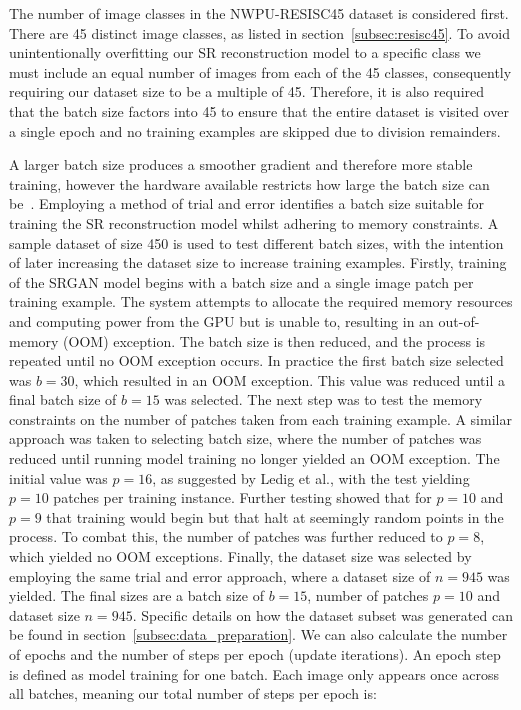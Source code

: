 The number of image classes in the NWPU-RESISC45 dataset is considered first. There are 45 distinct image classes, as listed in section~\ref{subsec:resisc45}. To avoid unintentionally overfitting our SR reconstruction model to a specific class we must include an equal number of images from each of the 45 classes, consequently requiring our dataset size to be a multiple of 45. Therefore, it is also required that the batch size factors into 45 to ensure that the entire dataset is visited over a single epoch and no training examples are skipped due to division remainders.

A larger batch size produces a smoother gradient and therefore more stable training, however the hardware available restricts how large the batch size can be~\cite{batchSizeTest}. Employing a method of trial and error identifies a batch size suitable for training the SR reconstruction model whilst adhering to memory constraints. A sample dataset of size 450 is used to test different batch sizes, with the intention of later increasing the dataset size to increase training examples. Firstly, training of the SRGAN model begins with a batch size and a single image patch per training example. The system attempts to allocate the required memory resources and computing power from the GPU but is unable to, resulting in an out-of-memory (OOM) exception. The batch size is then reduced, and the process is repeated until no OOM exception occurs. In practice the first batch size selected was $b = 30$, which resulted in an OOM exception. This value was reduced until a final batch size of $b = 15$ was selected. The next step was to test the memory constraints on the number of patches taken from each training example. A similar approach was taken to selecting batch size, where the number of patches was reduced until running model training no longer yielded an OOM exception. The initial value was $p = 16$, as suggested by Ledig et al., with the test yielding $p = 10$ patches per training instance. Further testing showed that for $p = 10$ and $p = 9$ that training would begin but that halt at seemingly random points in the process. To combat this, the number of patches was further reduced to $p = 8$, which yielded no OOM exceptions. Finally, the dataset size was selected by employing the same trial and error approach, where a dataset size of $n = 945$ was yielded. The final sizes are a batch size of $b = 15$, number of patches $p = 10$ and dataset size $n = 945$. Specific details on how the dataset subset was generated can be found in section~\ref{subsec:data_preparation}. We can also calculate the number of epochs and the number of steps per epoch (update iterations). An epoch step is defined as model training for one batch. Each image only appears once across all batches, meaning our total number of steps per epoch is:
